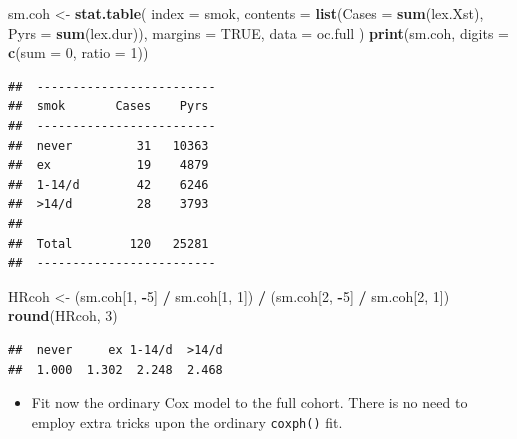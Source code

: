 \documentclass[
]{book}
\newenvironment{Shaded}{\begin{snugshade}}{\end{snugshade}}
\newcommand{\AttributeTok}[1]{\textcolor[rgb]{0.13,0.29,0.53}{#1}}
\newcommand{\ConstantTok}[1]{\textcolor[rgb]{0.56,0.35,0.01}{#1}}
\newcommand{\DecValTok}[1]{\textcolor[rgb]{0.00,0.00,0.81}{#1}}
\newcommand{\FunctionTok}[1]{\textcolor[rgb]{0.13,0.29,0.53}{\textbf{#1}}}
\newcommand{\NormalTok}[1]{#1}
\newcommand{\OtherTok}[1]{\textcolor[rgb]{0.56,0.35,0.01}{#1}}
\newcommand{\SpecialCharTok}[1]{\textcolor[rgb]{0.81,0.36,0.00}{\textbf{#1}}}
\providecommand{\tightlist}{%
  \setlength{\itemsep}{0pt}\setlength{\parskip}{0pt}}
\theoremstyle{definition}
\theoremstyle{definition}
\theoremstyle{definition}
\theoremstyle{definition}
\theoremstyle{remark}
\begin{document}
\begin{Shaded}
\begin{Highlighting}[]
\NormalTok{sm.coh }\OtherTok{\textless{}{-}} \FunctionTok{stat.table}\NormalTok{(}
  \AttributeTok{index =}\NormalTok{ smok,}
  \AttributeTok{contents =} \FunctionTok{list}\NormalTok{(}\AttributeTok{Cases =} \FunctionTok{sum}\NormalTok{(lex.Xst), }\AttributeTok{Pyrs =} \FunctionTok{sum}\NormalTok{(lex.dur)),}
  \AttributeTok{margins =} \ConstantTok{TRUE}\NormalTok{, }
  \AttributeTok{data =}\NormalTok{ oc.full}
\NormalTok{)}
\FunctionTok{print}\NormalTok{(sm.coh, }\AttributeTok{digits =} \FunctionTok{c}\NormalTok{(}\AttributeTok{sum =} \DecValTok{0}\NormalTok{, }\AttributeTok{ratio =} \DecValTok{1}\NormalTok{))}
\end{Highlighting}
\end{Shaded}

\begin{verbatim}
##  ------------------------- 
##  smok       Cases    Pyrs  
##  ------------------------- 
##  never         31   10363  
##  ex            19    4879  
##  1-14/d        42    6246  
##  >14/d         28    3793  
##                            
##  Total        120   25281  
##  -------------------------
\end{verbatim}

\begin{Shaded}
\begin{Highlighting}[]
\NormalTok{HRcoh }\OtherTok{\textless{}{-}} 
\NormalTok{  (sm.coh[}\DecValTok{1}\NormalTok{, }\SpecialCharTok{{-}}\DecValTok{5}\NormalTok{] }\SpecialCharTok{/}\NormalTok{ sm.coh[}\DecValTok{1}\NormalTok{, }\DecValTok{1}\NormalTok{]) }\SpecialCharTok{/}\NormalTok{ (sm.coh[}\DecValTok{2}\NormalTok{, }\SpecialCharTok{{-}}\DecValTok{5}\NormalTok{] }\SpecialCharTok{/}\NormalTok{ sm.coh[}\DecValTok{2}\NormalTok{, }\DecValTok{1}\NormalTok{])}
\FunctionTok{round}\NormalTok{(HRcoh, }\DecValTok{3}\NormalTok{)}
\end{Highlighting}
\end{Shaded}

\begin{verbatim}
##  never     ex 1-14/d  >14/d 
##  1.000  1.302  2.248  2.468
\end{verbatim}

\begin{itemize}
\tightlist
\item
  Fit now the ordinary Cox model to the full cohort. There is no need
  to employ extra tricks upon the ordinary \texttt{coxph()} fit.
\end{itemize}
\end{document}
